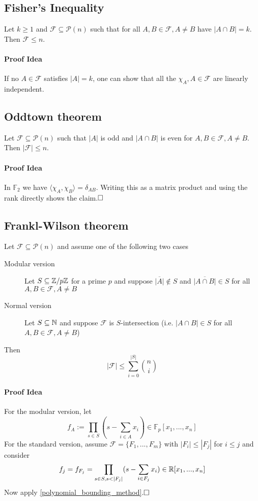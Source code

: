 \subsection{Fisher's Inequality}
Let $k \geq 1$ and $\mathcal{F} \subseteq \mathcal{P}(n)$ such that for all $A, B \in \mathcal{F}, A \neq B$ have $|A \cap B| = k$. Then $\mathcal{F} \leq n$.
\paragraph{Proof Idea} If no $A \in \mathcal{F}$ satisfies $|A| = k$, one can show that all the $\chi_A, A \in \mathcal{F}$ are linearly independent.

\subsection{Oddtown theorem}
Let $\mathcal{F} \subseteq \mathcal{P}(n)$ such that $|A|$ is odd and $|A \cap B|$ is even for $A, B \in \mathcal{F}, A \neq B$. Then $|\mathcal{F}| \leq n$.
\paragraph{Proof Idea} In $\mathbb{F}_2$ we have $\langle \chi_A, \chi_B \rangle = \delta_{AB}$. Writing this as a matrix product and using the rank directly shows the claim.$\hfill\square$

\subsection{Frankl-Wilson theorem}
Let $\mathcal{F} \subseteq \mathcal{P}(n)$ and assume one of the following two cases
\begin{description}
    \item[Modular version] Let $S \subseteq \mathbb{Z}/p\mathbb{Z}$ for a prime $p$ and suppose $\overline{|A|} \notin S$ and $\overline{|A \cap B|} \in S$ for all $A, B \in \mathcal{F}, A \neq B$
    \item[Normal version] Let $S \subseteq \mathbb{N}$ and suppose $\mathcal{F}$ is $S$-intersection (i.e. $|A \cap B| \in S$ for all $A, B \in \mathcal{F}, A \neq B$)
\end{description}
Then
\begin{equation*}
    |\mathcal{F}| \leq \sum_{i = 0}^{|S|} {n \choose i}
\end{equation*}
\paragraph{Proof Idea} For the modular version, let
\begin{equation*}
    f_A := \prod_{s \in S} (s - \sum_{i \in A} x_i) \in \mathbb{F}_p[x_1, ..., x_n]
\end{equation*}
For the standard version, assume $\mathcal{F} = \{ F_1, ..., F_m \}$ with $|F_i| \leq |F_j|$ for $i \leq j$ and consider
\begin{equation*}
    f_j = f_{F_j} = \prod_{s \in S, s < |F_j|} (s - \sum_{i \in F_j} x_i) \in \mathbb{R}[x_1, ..., x_n]
\end{equation*}
Now apply \ref{polynomial_bounding_method}.$\hfill\square$

